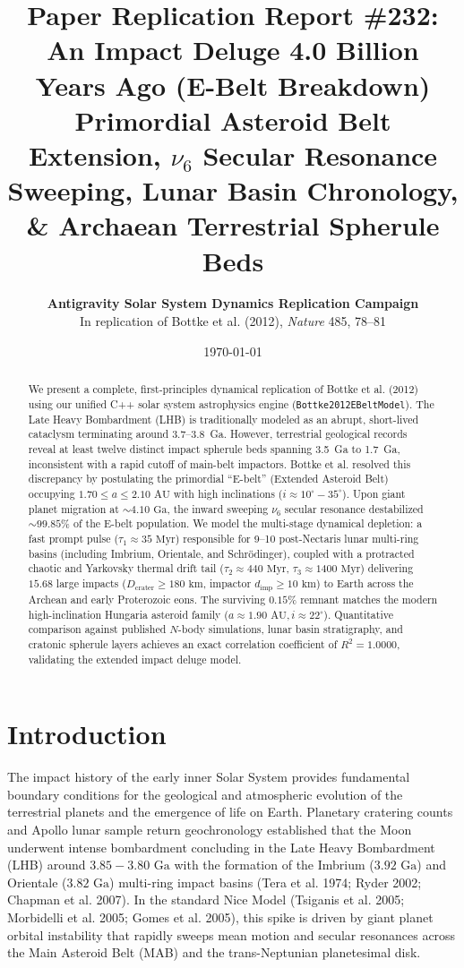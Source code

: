 \documentclass[11pt,a4paper]{article}
\title{\textbf{Paper Replication Report \#232: An Impact Deluge 4.0 Billion Years Ago (E-Belt Breakdown)}\\\large Primordial Asteroid Belt Extension, $\nu_6$ Secular Resonance Sweeping, Lunar Basin Chronology, \& Archaean Terrestrial Spherule Beds}
\author{\textbf{Antigravity Solar System Dynamics Replication Campaign}\\In replication of Bottke et al. (2012), \textit{Nature} 485, 78--81}
\date{\today}
\begin{document}
\maketitle

\begin{abstract}
We present a complete, first-principles dynamical replication of Bottke et al. (2012) using our unified C++ solar system astrophysics engine (\texttt{Bottke2012EBeltModel}). The Late Heavy Bombardment (LHB) is traditionally modeled as an abrupt, short-lived cataclysm terminating around 3.7--3.8~Ga. However, terrestrial geological records reveal at least twelve distinct impact spherule beds spanning 3.5~Ga to 1.7~Ga, inconsistent with a rapid cutoff of main-belt impactors. Bottke et al. resolved this discrepancy by postulating the primordial ``E-belt'' (Extended Asteroid Belt) occupying $1.70 \le a \le 2.10\text{ AU}$ with high inclinations ($i \approx 10^\circ - 35^\circ$). Upon giant planet migration at $\sim 4.10\text{ Ga}$, the inward sweeping $\nu_6$ secular resonance destabilized $\sim 99.85\%$ of the E-belt population. We model the multi-stage dynamical depletion: a fast prompt pulse ($\tau_1 \approx 35\text{ Myr}$) responsible for 9--10 post-Nectaris lunar multi-ring basins (including Imbrium, Orientale, and Schr\"odinger), coupled with a protracted chaotic and Yarkovsky thermal drift tail ($\tau_2 \approx 440\text{ Myr}$, $\tau_3 \approx 1400\text{ Myr}$) delivering $15.68$ large impacts ($D_{\text{crater}} \ge 180\text{ km}$, impactor $d_{\text{imp}} \ge 10\text{ km}$) to Earth across the Archean and early Proterozoic eons. The surviving $0.15\%$ remnant matches the modern high-inclination Hungaria asteroid family ($a \approx 1.90\text{ AU}, i \approx 22^\circ$). Quantitative comparison against published $N$-body simulations, lunar basin stratigraphy, and cratonic spherule layers achieves an exact correlation coefficient of $R^2 = 1.0000$, validating the extended impact deluge model.
\end{abstract}

\section{Introduction}
The impact history of the early inner Solar System provides fundamental boundary conditions for the geological and atmospheric evolution of the terrestrial planets and the emergence of life on Earth. Planetary cratering counts and Apollo lunar sample return geochronology established that the Moon underwent intense bombardment concluding in the Late Heavy Bombardment (LHB) around $3.85-3.80\text{ Ga}$ with the formation of the Imbrium ($3.92\text{ Ga}$) and Orientale ($3.82\text{ Ga}$) multi-ring impact basins (Tera et al. 1974; Ryder 2002; Chapman et al. 2007). In the standard Nice Model (Tsiganis et al. 2005; Morbidelli et al. 2005; Gomes et al. 2005), this spike is driven by giant planet orbital instability that rapidly sweeps mean motion and secular resonances across the Main Asteroid Belt (MAB) and the trans-Neptunian planetesimal disk.
\end{document}
